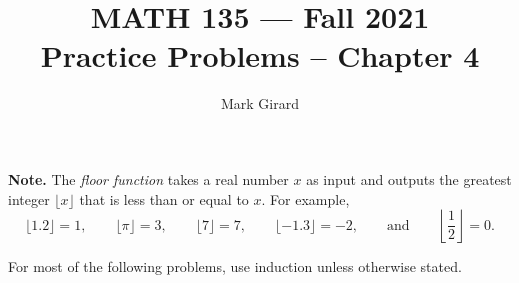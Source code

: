 \documentclass[11pt]{article}
\newif\ifshowsolution
\begin{document}
\title{MATH 135 --- Fall 2021\\ Practice Problems \ifshowsolution(Solutions)\fi -- Chapter 4}
\author{Mark Girard}

\maketitle

\noindent \textbf{Note.} The \emph{floor function} takes a real number $x$ as input and outputs the greatest integer $\lfloor x \rfloor$ that is less than or equal to $x$. For example,
 \[
  \lfloor 1.2\rfloor = 1,\qquad \lfloor \pi\rfloor = 3,\qquad\lfloor 7\rfloor = 7,\qquad \lfloor -1.3\rfloor = -2,\qquad \text{and} \qquad \left\lfloor \frac{1}{2}\right\rfloor = 0.
 \]

For most of the following problems, use induction unless otherwise stated.
\end{document}
